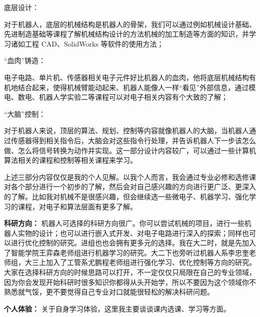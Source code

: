 \documentclass[11pt,oneside]{book}
\begin{document}
\vspace{10pt}

底层设计：

对于机器人，底层的机械结构是机器人的骨架，我们可以通过例如机械设计基础、先进制造基础等课程了解机械结构设计的方法机械的加工制造等方面的知识，并学习诸如工程 CAD、SolidWorks 等软件的使用方法；

\vspace{10pt}

“血肉”铸造：

电子电路、单片机、传感器相关电子元件好比机器人的血肉，他将底层机械结构有机地结合起来，使得机械臂能动起来、机器人能像人一样“看见”外部信息，通过模电、数电、机器人学实验二等课程可以对电子相关内容有个大致的了解；

\vspace{10pt}

“大脑”控制：

对于机器人来说，顶层的算法、规划、控制等内容就像机器人的大脑，当机器人通过传感器得到相关指令后，大脑会对这些指令行处理，并告诉机器人下一步该怎么做、怎么将信号转换为动作并实现。这一部分设计内容较广，可以通过一些计算机算法相关的课程和控制等相关课程来学习。

\vspace{10pt}

上述三部分内容仅仅是我的个人见解。以我个人而言，我会通过专业必修和选修课对各个部分进行一个初步的了解，然后会对自己感兴趣的方向进行更广泛、更深入的了解。比如我对机械不是很感兴趣，但会继续选一些微电子、机器学习、强化学习的课程，对电子和算法层面有更多了解。

\vspace{10pt}

\textbf{科研方向：}
机器人可选择的科研方向很广。你可以尝试机械的项目，进行一些机器人实物的设计；也可以进行嵌入式开发、对电子电路进行深入的探索；同样也可以进行优化控制的研究。进组也也会拥有更多元的选择。我在大二时，就是先加入了智能学院王弈森老师组进行机器学习的研究。大二下也旁听过机器人系李忠奎老师组，大三上加入了工管系尤鹏程老师组进行强化学习、优化控制等方向的研究。大家在选择科研方向的时候思路可以打开，不一定仅仅只局限在自己的专业领域，因为你会发现开始科研时很多知识你都得从头开始学，所以不要因为这个领域你不熟悉就气馁，更不要觉得自己专业对口就能很轻松的解决科研问题。

\vspace{10pt}

\textbf{个人体验：}
关于自身学习体验，这里我主要谈谈课内选课、学习等方面。

\vspace{10pt}
\end{document}
